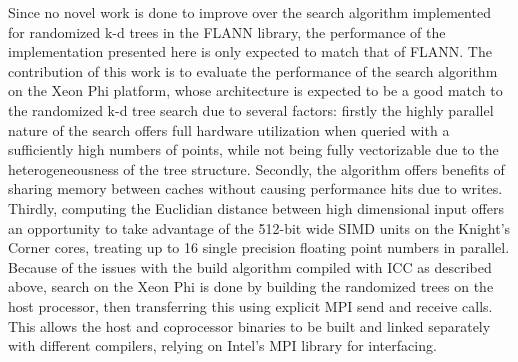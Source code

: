  Since no novel work is done to improve over the search algorithm implemented for randomized k-d trees in the FLANN library, the performance of the implementation presented here is only expected to match that of FLANN. The contribution of this work is to evaluate the performance of the search algorithm on the Xeon Phi platform, whose architecture is expected to be a good match to the randomized k-d tree search due to several factors: firstly the highly parallel nature of the search offers full
hardware utilization when queried with a sufficiently high numbers of points, while not being fully vectorizable due to the heterogeneousness of the tree structure. Secondly, the algorithm offers benefits of sharing memory between caches without causing performance hits due to writes. Thirdly, computing the Euclidian distance between high dimensional input offers an opportunity to take advantage of the 512-bit wide SIMD units on the Knight's Corner cores, treating up to 16
single precision floating point numbers in parallel. 
Because of the issues with the build algorithm compiled with ICC as described above, search on the Xeon Phi is done by building the randomized trees on the host processor, then transferring this using explicit MPI send and receive calls. This allows the host and coprocessor binaries to be built and linked separately with different compilers, relying on Intel's MPI library for interfacing.


